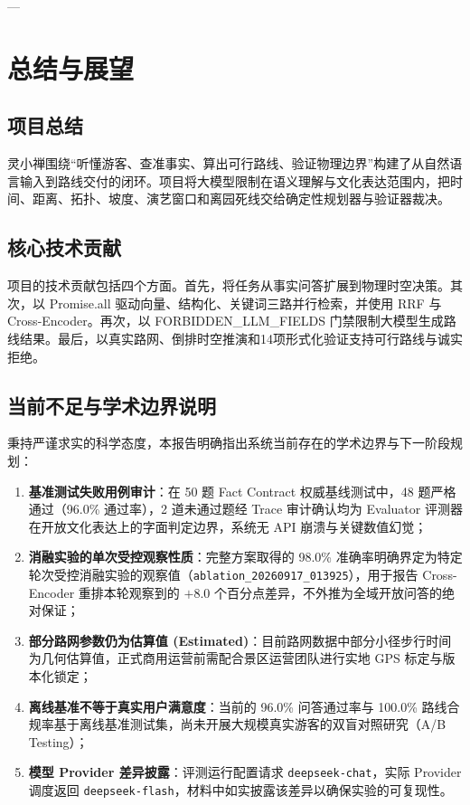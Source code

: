 \documentclass[11pt,a4paper]{ctexart}
\begin{document}
---

\section{总结与展望}

\subsection{项目总结}
灵小禅围绕“听懂游客、查准事实、算出可行路线、验证物理边界”构建了从自然语言输入到路线交付的闭环。项目将大模型限制在语义理解与文化表达范围内，把时间、距离、拓扑、坡度、演艺窗口和离园死线交给确定性规划器与验证器裁决。

\subsection{核心技术贡献}
项目的技术贡献包括四个方面。首先，将任务从事实问答扩展到物理时空决策。其次，以 Promise.all 驱动向量、结构化、关键词三路并行检索，并使用 RRF 与 Cross-Encoder。再次，以 FORBIDDEN\_LLM\_FIELDS 门禁限制大模型生成路线结果。最后，以真实路网、倒排时空推演和14项形式化验证支持可行路线与诚实拒绝。

\subsection{当前不足与学术边界说明}

秉持严谨求实的科学态度，本报告明确指出系统当前存在的学术边界与下一阶段规划：
\begin{enumerate}
    \item \textbf{基准测试失败用例审计}：在 50 题 Fact Contract 权威基线测试中，48 题严格通过（96.0\% 通过率），2 道未通过题经 Trace 审计确认均为 Evaluator 评测器在开放文化表达上的字面判定边界，系统无 API 崩溃与关键数值幻觉；
    \item \textbf{消融实验的单次受控观察性质}：完整方案取得的 98.0\% 准确率明确界定为特定轮次受控消融实验的观察值（\texttt{ablation\_20260917\_013925}），用于报告 Cross-Encoder 重排本轮观察到的 $+8.0$ 个百分点差异，不外推为全域开放问答的绝对保证；
    \item \textbf{部分路网参数仍为估算值 (Estimated)}：目前路网数据中部分小径步行时间为几何估算值，正式商用运营前需配合景区运营团队进行实地 GPS 标定与版本化锁定；
    \item \textbf{离线基准不等于真实用户满意度}：当前的 96.0\% 问答通过率与 100.0\% 路线合规率基于离线基准测试集，尚未开展大规模真实游客的双盲对照研究（A/B Testing）；
    \item \textbf{模型 Provider 差异披露}：评测运行配置请求 \texttt{deepseek-chat}，实际 Provider 调度返回 \texttt{deepseek-flash}，材料中如实披露该差异以确保实验的可复现性。
\end{enumerate}
\end{document}
